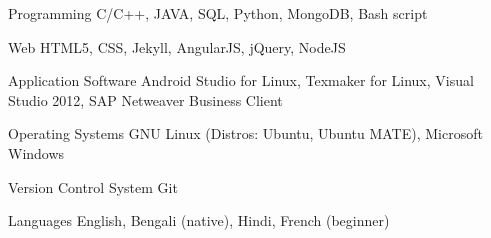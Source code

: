 


\begin{cvskills}


\cvskill
{Programming} %
{C/C++, JAVA, SQL, Python, MongoDB, Bash script} %


\cvskill
{Web} %
{HTML5, CSS, Jekyll, AngularJS, jQuery, NodeJS} %


\cvskill
{Application Software} %
{Android Studio for Linux, Texmaker for Linux, Visual Studio 2012, SAP Netweaver Business Client} %


\cvskill
{Operating Systems} %
{GNU Linux (Distros: Ubuntu, Ubuntu MATE), Microsoft Windows} %


\cvskill
{Version Control System} %
{Git} %


\cvskill
{Languages} %
{English, Bengali (native), Hindi, French (beginner)} %


\end{cvskills}
